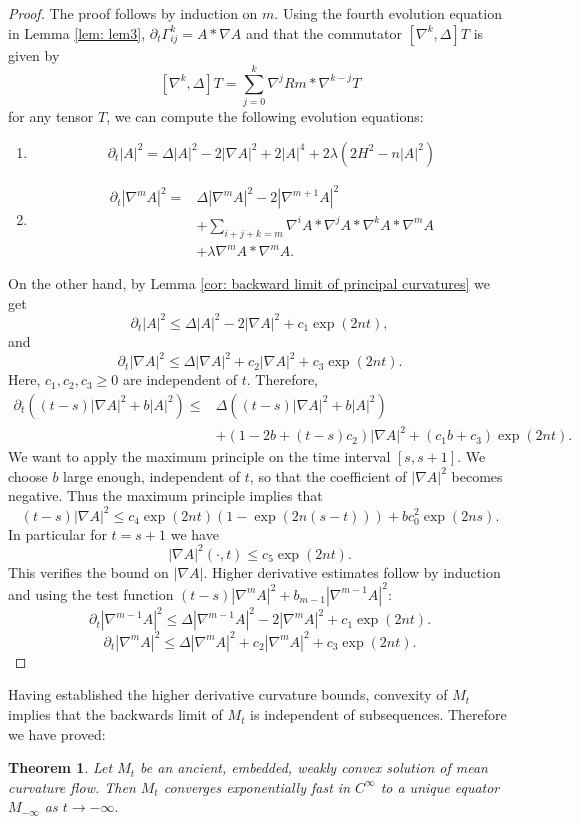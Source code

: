 \documentclass{amsart}
\newtheorem{theorem}{Theorem}
\theoremstyle{definition}
\theoremstyle{remark}
\numberwithin{equation}{section}
\begin{document}
\begin{proof}
The proof follows by induction on $m.$
Using the fourth evolution equation in Lemma \ref{lem: lem3}, $\partial_t\Gamma_{ij}^k=A\ast\nabla A$ and that the commutator $[\nabla^k,\Delta]T $ is given by
\[[\nabla^k,\Delta]T =\sum\limits_{j=0}^k\nabla^jRm\ast\nabla^{k-j}T\] for any tensor $T$, we can compute the following evolution equations:
\begin{enumerate}
  \item \[\partial_t |A|^2=\Delta |A|^2-2|\nabla A|^2+2|A|^4+2\lambda(2H^2-n|A|^2)\]
  \item \begin{align*}
  \partial_t |\nabla^mA|^2=&\Delta |\nabla^mA|^2-2 |\nabla^{m+1}A|^2\\
  &+\sum\limits_{i+j+k=m}\nabla^iA\ast\nabla^jA\ast\nabla^kA\ast\nabla^mA\\
  &+\lambda\nabla^mA\ast\nabla^mA.
         \end{align*}
\end{enumerate}
On the other hand, by Lemma \ref{cor: backward limit of principal curvatures} we get
\[\partial_t |A|^2\leq\Delta |A|^2-2|\nabla A|^2+c_1\exp(2nt),\]
and
\[\partial_t |\nabla A|^2\leq\Delta |\nabla A|^2+c_2|\nabla A|^2+c_3\exp(2nt).\]
Here, $c_1,c_2,c_3\geq0$ are independent of $t.$ Therefore,
\begin{align*}
\partial_t ((t-s)|\nabla A|^2+b|A|^2)\leq&\Delta((t-s)|\nabla A|^2+b|A|^2)\\
&+(1-2b+(t-s)c_2)|\nabla A|^2+(c_1b+c_3)\exp(2nt).
\end{align*}
We want to apply the maximum principle on the time interval $[s,s+1].$
We choose $b$ large enough, independent of $t$, so that the coefficient of $|\nabla A|^2$ becomes negative. Thus the maximum principle implies that
\[(t-s)|\nabla A|^2\leq c_4\exp(2n t)(1-\exp(2n(s-t) ))+bc_0^2 \exp(2ns).\]
In particular for $t=s+1$ we have
\[|\nabla A|^2(\cdot, t)\leq c_5\exp(2n t).\]
This verifies the bound on $|\nabla A|.$ Higher derivative estimates follow by induction and using the test function
$(t-s)|\nabla^mA|^2+b_{m-1}|\nabla^{m-1}A|^2:$
\[\partial_t |\nabla^{m-1} A|^2\leq\Delta |\nabla^{m-1} A|^2-2 |\nabla^{m}A|^2+c_1\exp(2nt).\]
\[\partial_t |\nabla^m A|^2\leq\Delta |\nabla^m A|^2+c_2|\nabla^m A|^2+c_3\exp(2nt).\]
\end{proof}
Having established the higher derivative curvature bounds, convexity of $M_t$ implies that the backwards limit of $M_t$ is independent of subsequences. Therefore we have proved:
\begin{theorem}\label{thm8}
Let $M_t$ be an ancient, embedded, weakly convex solution of mean curvature flow. Then $M_t$ converges exponentially fast in $C^{\infty}$ to a unique equator $M_{-\infty}$ as $t\to-\infty.$
\end{theorem}
\end{document}
